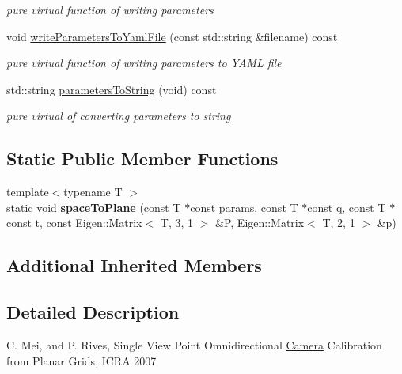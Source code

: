 \begin{DoxyCompactItemize}
\begin{DoxyCompactList}\small\item\em pure virtual function of writing parameters \end{DoxyCompactList}\item 
\mbox{\label{classcamodocal_1_1CataCamera_a25c2751e920c24922c0681119afe9924}} 
void \hyperlink{classcamodocal_1_1CataCamera_a25c2751e920c24922c0681119afe9924}{write\+Parameters\+To\+Yaml\+File} (const std\+::string \&filename) const
\begin{DoxyCompactList}\small\item\em pure virtual function of writing parameters to Y\+A\+ML file \end{DoxyCompactList}\item 
\mbox{\label{classcamodocal_1_1CataCamera_a0c54d518ef4eddcfd9fb878c26bb2685}} 
std\+::string \hyperlink{classcamodocal_1_1CataCamera_a0c54d518ef4eddcfd9fb878c26bb2685}{parameters\+To\+String} (void) const
\begin{DoxyCompactList}\small\item\em pure virtual of converting parameters to string \end{DoxyCompactList}\end{DoxyCompactItemize}
\subsection*{Static Public Member Functions}
\begin{DoxyCompactItemize}
\item 
\mbox{\label{classcamodocal_1_1CataCamera_a1c87fe2e89b19c9fd23d048d1650039c}} 
{\footnotesize template$<$typename T $>$ }\\static void {\bfseries space\+To\+Plane} (const T $\ast$const params, const T $\ast$const q, const T $\ast$const t, const Eigen\+::\+Matrix$<$ T, 3, 1 $>$ \&P, Eigen\+::\+Matrix$<$ T, 2, 1 $>$ \&p)
\end{DoxyCompactItemize}
\subsection*{Additional Inherited Members}


\subsection{Detailed Description}
C. Mei, and P. Rives, Single View Point Omnidirectional \hyperlink{classcamodocal_1_1Camera}{Camera} Calibration from Planar Grids, I\+C\+RA 2007 

